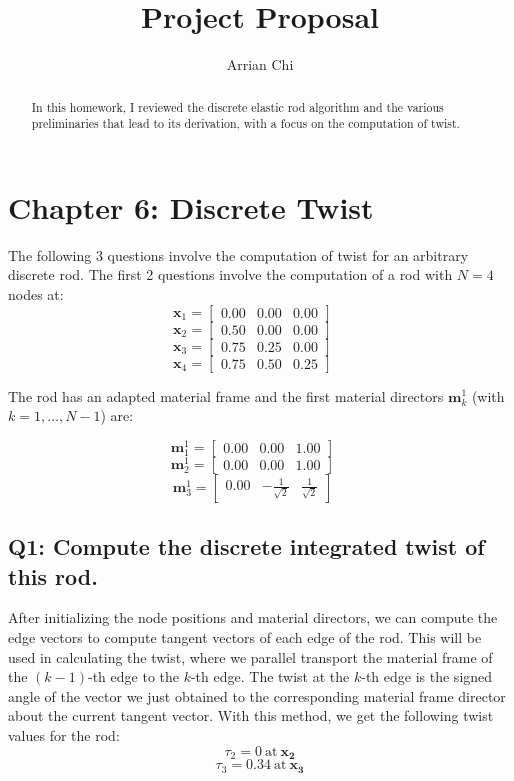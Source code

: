 \documentclass[letterpaper, 10 pt, conference]{ieeeconf}  %
\title{\LARGE \bf
Project Proposal
}
\author{Arrian Chi%
}
\begin{document}
\onecolumn


\maketitle
\thispagestyle{empty}
\pagestyle{empty}



\begin{abstract}

In this homework, I reviewed the discrete elastic rod algorithm and the various preliminaries that lead to its derivation, with a focus on the computation of twist. 

\end{abstract}
\section{Chapter 6: Discrete Twist}
The following 3 questions involve the computation of twist for an arbitrary discrete rod. The first 2 questions involve the computation of a rod with $ N = 4 $ nodes at:
\[ \mathbf{x}_1 = \begin{bmatrix} 0.00 & 0.00 & 0.00 \end{bmatrix} \quad \]
\[ \mathbf{x}_2 = \begin{bmatrix} 0.50 & 0.00 & 0.00 \end{bmatrix} \quad \]
\[ \mathbf{x}_3 = \begin{bmatrix} 0.75 & 0.25 & 0.00 \end{bmatrix} \quad \]
\[ \mathbf{x}_4 = \begin{bmatrix} 0.75 & 0.50 & 0.25 \end{bmatrix} \quad \]


The rod has an adapted material frame and the first material directors \( \mathbf{m}_k^1 \) (with \( k = 1, \ldots, N-1 \)) are:


\[\mathbf{m}_1^1 = \begin{bmatrix} 0.00 & 0.00 & 1.00 \end{bmatrix} \quad \]
\[\mathbf{m}_2^1 = \begin{bmatrix} 0.00 & 0.00 & 1.00 \end{bmatrix} \quad \]
\[\mathbf{m}_3^1 = \begin{bmatrix} 0.00 & -\frac{1}{\sqrt{2}} & \frac{1}{\sqrt{2}} \end{bmatrix} \quad \]


\subsection*{Q1: Compute the discrete integrated twist of this rod.}
After initializing the node positions and material directors, we can compute the edge vectors to compute tangent vectors of each edge of the rod. This will be used in calculating the twist, where we parallel transport the material frame of the $(k -1)$-th edge to the $k$-th edge. The twist at the $k$-th edge is the signed angle of the vector we just obtained to the corresponding material frame director about the current tangent vector. With this method, we get the following twist values for the rod:
\[ \tau_2 = 0 \ \text{at} \ \mathbf{x_2}\]
\[\tau_3 = 0.34\ \text{at} \ \mathbf{x_3} \]
\end{document}
